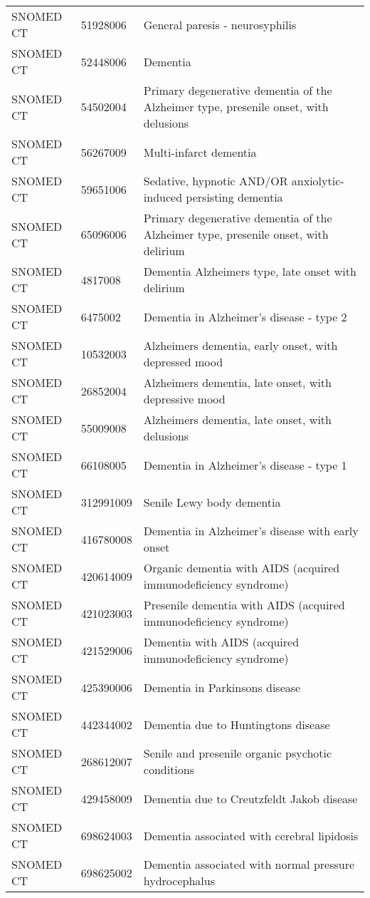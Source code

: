 \begin{longtable}{p{}p{}p{}}
  SNOMED CT & 51928006 & General paresis - neurosyphilis \\ 
  SNOMED CT & 52448006 & Dementia \\ 
  SNOMED CT & 54502004 & Primary degenerative dementia of the Alzheimer type, presenile onset, with delusions \\ 
  SNOMED CT & 56267009 & Multi-infarct dementia \\ 
  SNOMED CT & 59651006 & Sedative, hypnotic AND/OR anxiolytic-induced persisting dementia \\ 
  SNOMED CT & 65096006 & Primary degenerative dementia of the Alzheimer type, presenile onset, with delirium \\ 
  SNOMED CT & 4817008 & Dementia Alzheimers type, late onset with delirium \\ 
  SNOMED CT & 6475002 & Dementia in Alzheimer's disease - type 2 \\ 
  SNOMED CT & 10532003 & Alzheimers dementia, early onset, with depressed mood \\ 
  SNOMED CT & 26852004 & Alzheimers dementia, late onset, with depressive mood \\ 
  SNOMED CT & 55009008 & Alzheimers dementia, late onset, with delusions \\ 
  SNOMED CT & 66108005 & Dementia in Alzheimer's disease - type 1 \\ 
  SNOMED CT & 312991009 & Senile Lewy body dementia \\ 
  SNOMED CT & 416780008 & Dementia in Alzheimer's disease with early onset \\ 
  SNOMED CT & 420614009 & Organic dementia with AIDS (acquired immunodeficiency syndrome) \\ 
  SNOMED CT & 421023003 & Presenile dementia with AIDS (acquired immunodeficiency syndrome) \\ 
  SNOMED CT & 421529006 & Dementia with AIDS (acquired immunodeficiency syndrome) \\ 
  SNOMED CT & 425390006 & Dementia in Parkinsons disease \\ 
  SNOMED CT & 442344002 & Dementia due to Huntingtons disease \\ 
  SNOMED CT & 268612007 & Senile and presenile organic psychotic conditions \\ 
  SNOMED CT & 429458009 & Dementia due to Creutzfeldt Jakob disease \\ 
  SNOMED CT & 698624003 & Dementia associated with cerebral lipidosis \\ 
  SNOMED CT & 698625002 & Dementia associated with normal pressure hydrocephalus \\ 

\end{longtable}
